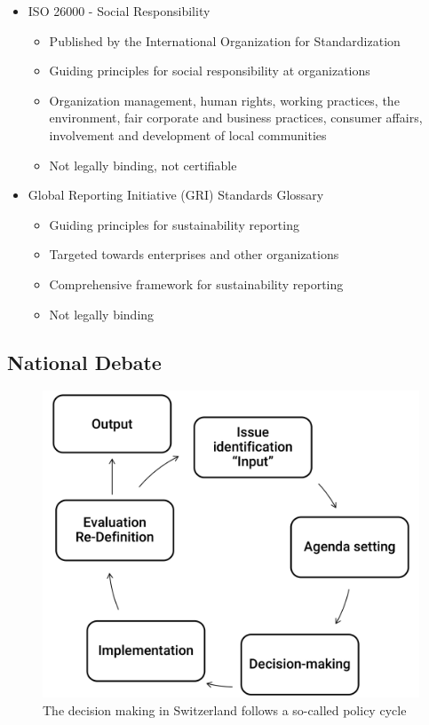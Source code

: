 \documentclass[11pt]{article}
\theoremstyle{definition}
\begin{document}
\begin{itemize}
\begin{itemize}
	\end{itemize}
	\item ISO 26000 - Social Responsibility
	\begin{itemize}
		\item Published by the International Organization for Standardization
		\item Guiding principles for social responsibility at organizations
		\item Organization management, human rights, working practices, the environment, fair corporate and business practices, consumer affairs, involvement and development of local communities
		\item Not legally binding, not certifiable
	\end{itemize}
	\item Global Reporting Initiative (GRI) Standards Glossary
	\begin{itemize}
		\item Guiding principles for sustainability reporting
		\item Targeted towards enterprises and other organizations
		\item Comprehensive framework for sustainability reporting
		\item Not legally binding
	\end{itemize}
\end{itemize}

\subsection{National Debate}

\begin{figure}[H]
	\centering
	\includegraphics[width=0.6\linewidth]{img/national_decision_making}
	\caption{The decision making in Switzerland follows a so-called policy cycle}
	\label{fig:nationaldecisionmaking}
\end{figure}
\end{document}
